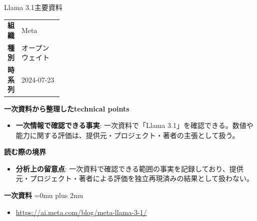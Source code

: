 \begin{technicalnote}{Llama 3.1}{主要資料}
\begingroup
\begin{tabularx}{\linewidth}{@{}>{\bfseries}p{0.22\linewidth}X@{}}
組織 & Meta \\
種別 & オープンウェイト \\
時系列 & 2024-07-23 \\
\end{tabularx}
\smallskip
{\bfseries 一次資料から整理したtechnical points}
\begin{itemize}[leftmargin=1.5em,itemsep=0.35em]
\item \textbf{一次情報で確認できる事実}: 一次資料で「Llama 3.1」を確認できる。数値や能力に関する評価は、提供元・プロジェクト・著者の主張として扱う。
\end{itemize}
\begin{minipage}{\linewidth}
{\bfseries 読む際の境界}
\begin{itemize}[leftmargin=1.5em,itemsep=0.35em]
\item \textbf{分析上の留意点}: 一次資料で確認できる範囲の事実を記録しており、提供元・プロジェクト・著者による評価を独立再現済みの結果として扱わない。
\end{itemize}
\begin{samepage}
{\bfseries 一次資料}
\begingroup\sloppy
\Urlmuskip=0mu plus 2mu\relax
\begin{itemize}[leftmargin=1.5em,itemsep=0.25em]
\item {\scriptsize\url{https://ai.meta.com/blog/meta-llama-3-1/}}
\end{itemize}
\endgroup
\end{samepage}
\end{minipage}
\endgroup
\end{technicalnote}
\medskip

